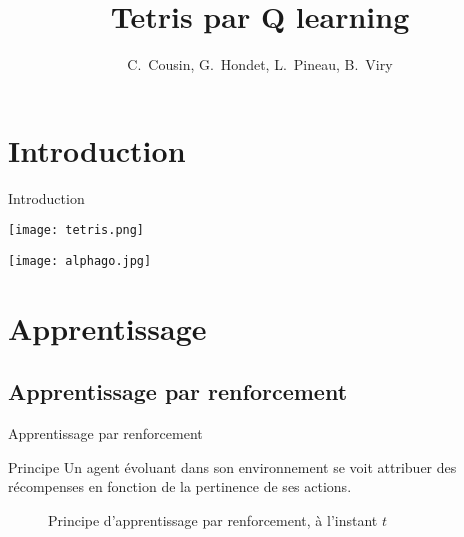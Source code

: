 \documentclass[tikz, footheight=2em]{beamer}
\title{Tetris par Q learning}
\author{C.~Cousin, G.~Hondet, L.~Pineau, B.~Viry}
\date{}
\begin{document}
\frame{\titlepage}


\section*{Introduction}
\begin{frame}[c]{Introduction}
  \begin{center}
    \begin{minipage}[c]{0.4\linewidth}
      \texttt{[image: tetris.png]}
    \end{minipage}
    \begin{minipage}[c]{0.4\linewidth}
      \texttt{[image: alphago.jpg]}
    \end{minipage}
  \end{center}
\end{frame}

\section{Apprentissage}
\subsection{Apprentissage par renforcement}
\begin{frame}{Apprentissage par renforcement}
  \begin{block}{Principe}
    Un agent évoluant dans son environnement se voit attribuer des
    récompenses en fonction de la pertinence de ses actions.
    \begin{figure}[h]
      \begin{center}
      \end{center}
      \caption{Principe d'apprentissage par renforcement, à l'instant \(t\)}
      \label{fig:reinforcement_learning}
    \end{figure}
  \end{block}
\end{frame}
\end{document}
